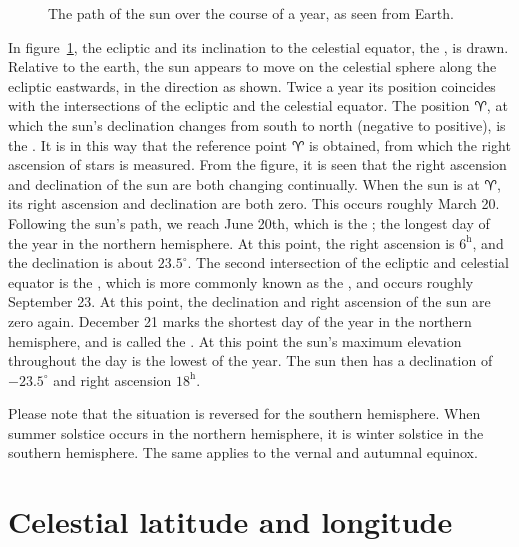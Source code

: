 \begin{figure}[htpb]
	\centering
	
	\caption{The path of the sun over the course of a year, as seen from Earth.}
	\label{fig:cel-sph-ecl}
\end{figure}
%
In figure~\ref{fig:cel-sph-ecl}, the ecliptic and its inclination to the celestial
equator, the , is drawn. Relative to the earth, the sun
appears to move on the celestial sphere along the ecliptic eastwards, in the direction as
shown. Twice a year its position coincides with the intersections of the ecliptic and the
celestial equator. The position $\aries$, at which the sun's declination changes from
south to north (negative to positive), is the . It is in this way
that the reference point $\aries$ is obtained, from which the right ascension of stars is
measured. From the figure, it is seen that the right ascension and declination of the sun
are both changing continually. When the sun is at $\aries$, its right ascension and
declination are both zero. This occurs roughly March 20. Following the sun's path, we
reach June 20th, which is the ; the longest day of the year
in the northern hemisphere. At this point, the right ascension is $6^{\mathrm{h}}$, and
the declination is about $23.5^\circ$. The second intersection of the ecliptic and
celestial equator is the , which is more commonly known as the
, and occurs roughly September 23. At this point, the declination
and right ascension of the sun are zero again. December 21 marks the shortest day of the
year in the northern hemisphere, and is called the . At this
point the sun's maximum elevation throughout the day is the lowest of the year. The sun
then has a declination of $-23.5^\circ$ and right ascension
$18^{\mathrm{h}}$.

Please note that the situation is reversed for the southern hemisphere. When summer
solstice occurs in the northern hemisphere, it is winter solstice in the southern
hemisphere. The same applies to the vernal and autumnal equinox.

\section{Celestial latitude and longitude}
\label{sec:cel-lat-lon}

